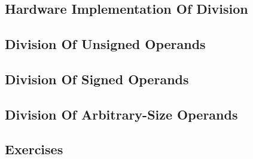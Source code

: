 \chapter{\cdivzerolongtitle{}}

\label{cdiv0}

\section{Hardware Implementation Of Division}

\section{Division Of Unsigned Operands}

\section{Division Of Signed Operands}

\section{Division Of Arbitrary-Size Operands}

\section{Exercises}


